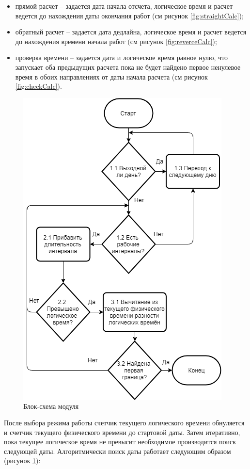 \begin{itemize}
	\item прямой расчет -- задается дата начала отсчета, логическое время и расчет ведется до нахождения даты окончания работ (см рисунок \ref{fig:straightCalc});
	\item обратный расчет -- задается дата дедлайна, логическое время и расчет ведется до нахождения времени начала работ (см рисунок \ref{fig:reverceCalc});
	\item проверка времени -- задается дата и логическое время равное нулю, что запускает оба предыдущих расчета пока не будет найдено первое ненулевое время в обоих направлениях от даты начала расчета (см рисунок \ref{fig:checkCalc}).
\end{itemize}

\begin{figure}[h!]
	\centering
	\includegraphics[width=0.7\linewidth]{pics/scheduleSchema.png}
	\caption{Блок-схема модуля}
	\label{fig:schema}
\end{figure}

\indent После выбора режима работы счетчик текущего логического времени обнуляется и счетчик текущего физического времени до стартовой даты. Затем итеративно, пока текущее логическое время не превысит необходимое производится поиск следующей даты.
Алгоритмически поиск даты работает следующим образом (рисунок \ref{fig:schema}):

